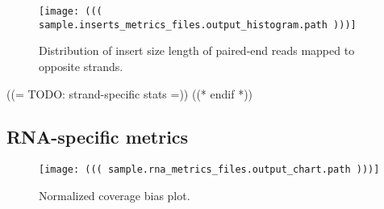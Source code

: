 {
    \begin{figure}[h!]
        \centering
        \texttt{[image: ((( sample.inserts\_metrics\_files.output\_histogram.path )))]}
        \caption{Distribution of insert size length of paired-end reads mapped to opposite strands.}
    \end{figure}
}
((= TODO: strand-specific stats
=))
((* endif *))


\subsection{RNA-specific metrics}

{
    \begin{figure}[h!]
        \centering
        \texttt{[image: ((( sample.rna\_metrics\_files.output\_chart.path )))]}
        \caption{Normalized coverage bias plot.}
    \end{figure}
}

